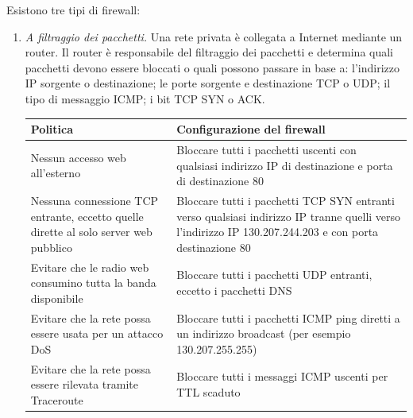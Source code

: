 Esistono tre tipi di firewall:
\begin{enumerate}
    \item \textit{A filtraggio dei pacchetti.} Una rete privata è collegata a Internet mediante un router. Il router è responsabile del filtraggio dei pacchetti e determina quali pacchetti devono essere bloccati o quali possono passare in base a: l'indirizzo IP sorgente o destinazione; le porte sorgente e destinazione TCP o UDP; il tipo di messaggio ICMP; i bit TCP SYN o ACK. 

    \begin{center}
    \begin{tabular}{|p{6cm}|p{7cm}|}
    \hline
    \textbf{Politica} & \textbf{Configurazione del firewall}\\\hline
    Nessun accesso web all’esterno & Bloccare tutti i pacchetti uscenti con qualsiasi indirizzo IP di destinazione e porta di destinazione 80\\\hline
    Nessuna connessione TCP entrante, eccetto quelle dirette al solo server web pubblico & Bloccare tutti i pacchetti TCP SYN entranti verso qualsiasi indirizzo IP tranne quelli verso l’indirizzo IP 130.207.244.203 e con porta destinazione 80\\\hline
    Evitare che le radio web consumino tutta la banda disponibile & Bloccare tutti i pacchetti UDP entranti, eccetto i pacchetti DNS\\\hline
    Evitare che la rete possa essere usata per un attacco DoS & Bloccare tutti i pacchetti ICMP ping diretti a un indirizzo broadcast (per esempio 130.207.255.255)\\\hline
    Evitare che la rete possa essere rilevata tramite Traceroute & Bloccare tutti i messaggi ICMP uscenti per TTL scaduto\\\hline
    \end{tabular}
    \end{center}


\end{enumerate}
